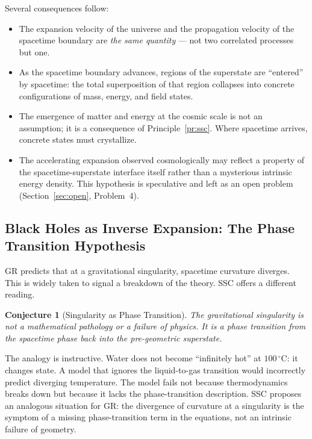\documentclass[12pt,a4paper]{article}
\newtheorem{conjecture}{Conjecture}
\begin{document}
\noindent
Several consequences follow:
\begin{itemize}
  \item The expansion velocity of the universe and the propagation
        velocity of the spacetime boundary are \emph{the same
        quantity} — not two correlated processes but one.
  \item As the spacetime boundary advances, regions of the superstate
        are ``entered'' by spacetime: the total superposition of that
        region collapses into concrete configurations of mass, energy,
        and field states.
  \item The emergence of matter and energy at the cosmic scale is not
        an assumption; it is a consequence of Principle~\ref{pr:ssc}.
        Where spacetime arrives, concrete states must crystallize.
  \item The accelerating expansion observed cosmologically may reflect
        a property of the spacetime-superstate interface itself rather
        than a mysterious intrinsic energy density.  This hypothesis
        is speculative and left as an open problem
        (Section~\ref{sec:open}, Problem~4).
\end{itemize}

\subsection{Black Holes as Inverse Expansion: The Phase Transition Hypothesis}
\label{sec:blackholes}

GR predicts that at a gravitational singularity, spacetime curvature
diverges.  This is widely taken to signal a breakdown of the theory.
SSC offers a different reading.

\begin{conjecture}[Singularity as Phase Transition]
\label{conj:singularity}
The gravitational singularity is not a mathematical pathology or a
failure of physics.  It is a \emph{phase transition} from the
spacetime phase back into the pre-geometric superstate.
\end{conjecture}

\noindent
The analogy is instructive.  Water does not become ``infinitely hot''
at \(100\,^{\circ}\mathrm{C}\): it changes state.  A model that ignores
the liquid-to-gas transition would incorrectly predict diverging
temperature.  The model fails not because thermodynamics breaks down
but because it lacks the phase-transition description.  SSC proposes
an analogous situation for GR: the divergence of curvature at a
singularity is the symptom of a missing phase-transition term in the
equations, not an intrinsic failure of geometry.
\end{document}
